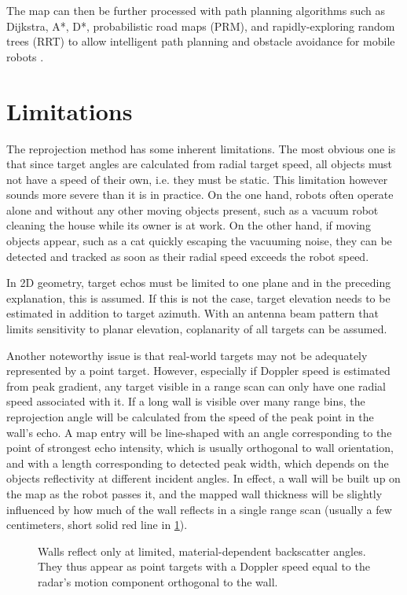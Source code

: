 The map can then be further processed with path planning algorithms such as Dijkstra, A*, D*, probabilistic road maps (PRM), and rapidly-exploring random trees (RRT) to allow intelligent path planning and obstacle avoidance for mobile robots \cite{Correll2016}.

\section{Limitations}\label{limitations}

The reprojection method has some inherent limitations. The most obvious one is that since target angles are calculated from radial target speed, all objects must not have a speed of their own, i.e. they must be static. This limitation however sounds more severe than it is in practice. On the one hand, robots often operate alone and without any other moving objects present, such as a vacuum robot cleaning the house while its owner is at work. On the other hand, if moving objects appear, such as a cat quickly escaping the vacuuming noise, they can be detected and tracked as soon as their radial speed exceeds the robot speed.

In 2D geometry, target echos must be limited to one plane and in the preceding explanation, this is assumed. If this is not the case, target elevation needs to be estimated in addition to target azimuth. With an antenna beam pattern that limits sensitivity to planar elevation, coplanarity of all targets can be assumed.

Another noteworthy issue is that real-world targets may not be adequately represented by a point target. However, especially if Doppler speed is estimated from peak gradient, any target visible in a range scan can only have one radial speed associated with it. If a long wall is visible over many range bins, the reprojection angle will be calculated from the speed of the peak point in the wall's echo. A map entry will be line-shaped with an angle corresponding to the point of strongest echo intensity, which is usually orthogonal to wall orientation, and with a length corresponding to detected peak width, which depends on the objects reflectivity at different incident angles. In effect, a wall will be built up on the map as the robot passes it, and the mapped wall thickness will be slightly influenced by how much of the wall reflects in a single range scan (usually a few centimeters, short solid red line in \cref{fig:wall}).

\begin{figure}[htbp]
    \centering
    \def\svgwidth{7.5cm}
    
    \caption{Walls reflect only at limited, material-dependent backscatter angles. They thus appear as point targets with a Doppler speed equal to the radar's motion component orthogonal to the wall.}
    \label{fig:wall}
\end{figure}

